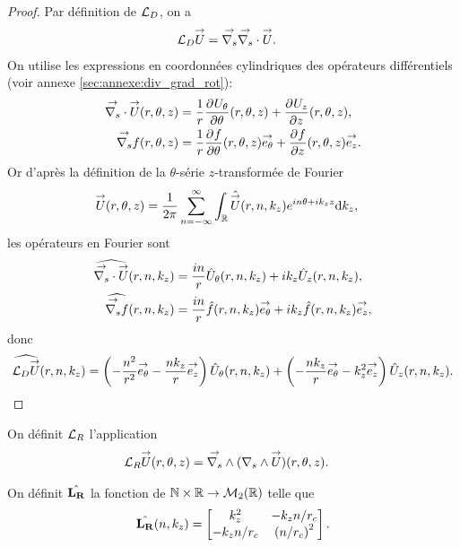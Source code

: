     \begin{proof}
      Par définition de \(\LD\), on a
      \begin{align*}
        \LD \vect{U} & = \vgrads{} \vdivs{} \vect{U}.
      \end{align*}
      On utilise les expressions en coordonnées cylindriques des opérateurs différentiels (voir annexe \ref{sec:annexe:div_grad_rot}):
      \begin{align*}
        \vdivs{\vect{U}}(r,\theta,z) &= \frac{1}{r}\ddr{\theta}{U_\theta}(r,\theta,z) + \ddr{z}{U_z}(r,\theta,z),
        \\
        \vgrads{f}(r,\theta,z) &= \frac{1}{r}\ddr{\theta}{f}(r,\theta,z)\vect{e_\theta} + \ddr{z}{f}(r,\theta,z)\vect{e_z}.
      \end{align*}
      Or d’après la définition de la \(\theta\)-série \(z\)-transformée de Fourier
      \begin{align*}
        \vect{U}(r,\theta,z) & = \frac{1}{2\pi}\sum_{n=-\infty}^\infty \int_\RR \hat{\vect{U}}(r,n,k_z)e^{in\theta + ik_zz}\dd{k_z},
      \end{align*}
      les opérateurs en Fourier sont
      \begin{align*}
        \widehat{\vdivs{\vect{U}}}(r,n,k_z) &= \frac{in}{r}{\hat{U}_\theta}(r,n,k_z) + ik_z{\hat{U}_z}(r,n,k_z),
        \\
        \widehat{\vgrads{f}}(r,n,k_z) &= \frac{in}{r}\hat{f}(r,n,k_z)\vect{e_\theta} + ik_z\hat{f}(r,n,k_z)\vect{e_z},
      \end{align*}
      donc
      \begin{align*}
        \widehat{\LD{\vect{U}}}(r,n,k_z) =  \left(-\frac{n^2}{r^2}\vect{e_\theta} - \frac{nk_z}{r}\vect{e_z}\right){\hat{U}_\theta}(r,n,k_z) + \left(-\frac{nk_z}{r}\vect{e_\theta} - {k_z^2}\vect{e_z}\right){\hat{U}_z}(r,n,k_z).
      \end{align*}

    \end{proof}


    \begin{defn}
      \label{eq:cylindre:fourier:LR}

      On définit \(\LR\) l'application
      \begin{align*}
        \LR \vect{U}(r,\theta,z) & = \vrots{} (\rots{} \vect{U})(r,\theta,z).
      \end{align*}

      On définit \(\hat{\mLR}\) la fonction de \(\NN\times\RR \rightarrow \mathcal{M}_2(\RR)\) telle que
      \begin{equation*}
        \hat{\mLR}(n,k_z) = 
        \begin{bmatrix}
          k_z^2 & -k_z{n}\slash{r_c}
          \\
          -k_z{n}\slash{r_c} & \left({n}\slash{r_c}\right)^2
        \end{bmatrix}.
      \end{equation*}
    \end{defn}

